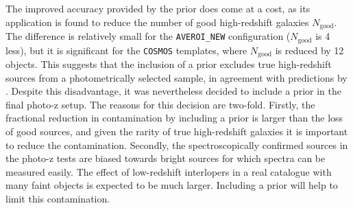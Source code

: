 The improved accuracy provided by the prior does come at a cost, as its application is found to reduce the number of good high-redshift galaxies $N_{\mathrm{good}}$. The difference is relatively small for the \texttt{AVEROI\_NEW} configuration ($N_{\mathrm{good}}$ is 4 less), but it is significant for the \texttt{COSMOS} templates, where $N_{\mathrm{good}}$ is reduced by 12 objects. This suggests that the inclusion of a prior excludes true high-redshift sources from a photometrically selected sample, in agreement with predictions by \cite{2000ApJ...536..571B}. Despite this disadvantage, it was nevertheless decided to include a prior in the final photo-z setup. The reasons for this decision are two-fold. Firstly, the fractional reduction in contamination by including a prior is larger than the loss of good sources, and given the rarity of true high-redshift galaxies it is important to reduce the contamination. Secondly, the spectroscopically confirmed sources in the photo-z tests are biased towards bright sources for which spectra can be measured easily. The effect of low-redshift interlopers in a real catalogue with many faint objects is expected to be much larger. Including a prior will help to limit this contamination.\par  


